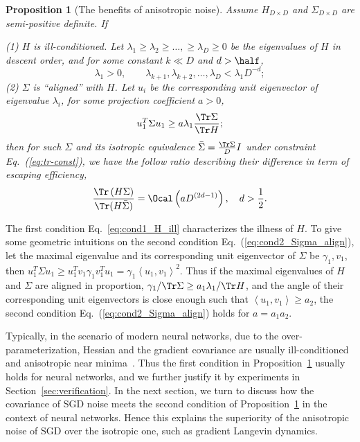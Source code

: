 \documentclass{article}
\newtheorem{proposition}{Proposition}
\begin{document}
\begin{proposition}[The benefits of anisotropic noise]
Assume $H_{D\times D}$ and $\Sigma_{D\times D}$ are semi-positive definite. If 

(1) $H$ is ill-conditioned.
Let $\lambda_1 \ge \lambda_2 \ge \dots, \ge \lambda_D \ge 0$ be the eigenvalues of $H$ in descent order, and for some constant $k\ll D$ and $d>\half$,
\begin{equation}
    \lambda_1 > 0,\qquad \lambda_{k+1}, \lambda_{k+2}, \dots, \lambda_{D} < \lambda_1 D^{-d};
    \label{eq:cond1_H_ill}
\end{equation}
(2) $\Sigma$ is ``aligned'' with $H$.
Let $u_i$ be the corresponding unit eigenvector of eigenvalue $\lambda_i$, for some projection coefficient $a>0$,
\begin{equation}
    u_1^T\Sigma u_1 \ge a \lambda_1 \frac{\Tr\Sigma}{\Tr H};
    \label{eq:cond2_Sigma_align}
\end{equation}
then for such $\Sigma$ and its isotropic equivalence $\bar{\Sigma} = \frac{\Tr\Sigma}{D}I$ under constraint Eq.~(\ref{eq:tr-const}),
we have the follow ratio describing their difference in term of escaping efficiency,
\begin{equation}
    \frac{\Tr\left(H\Sigma\right)}{\Tr(H\bar{\Sigma})} = \Ocal \left(a D^{(2d-1)}\right), \quad d > \frac{1}{2}.
    \label{eq:ratio}
\end{equation}
\label{thm:aniso_benefit}
\end{proposition}
The first condition Eq.~\eqref{eq:cond1_H_ill} characterizes the illness of $H$.
To give some geometric intuitions on the second condition Eq.~(\ref{eq:cond2_Sigma_align}), let the maximal eigenvalue and its corresponding unit eigenvector of $\Sigma$ be $\gamma_1, v_1$, then
$ u_1^T\Sigma u_1 \geq u_1^Tv_1\gamma_1 v_1^T u_1 = \gamma_1 \left<u_1, v_1\right>^2 $.
Thus if the maximal eigenvalues of $H$ and $\Sigma$ are aligned in proportion, $\gamma_1/\Tr\Sigma \ge a_1 \lambda_1/\Tr H$, and the angle of their corresponding unit eigenvectors is close enough such that $\left<u_1, v_1\right> \ge a_2$, the second condition Eq.~(\ref{eq:cond2_Sigma_align}) holds for $a =a_1 a_2$.

Typically, in the scenario of modern neural networks, due to the over-parameterization, Hessian and the gradient covariance are usually ill-conditioned and anisotropic near minima~\citep{sagun2017empirical,chaudhari2017stochastic}. Thus the first condition in Proposition~\ref{thm:aniso_benefit} usually holds for neural networks, and we further justify it by experiments in Section~\ref{sec:verification}. 
In the next section, we turn to discuss how the covariance of SGD noise meets the second condition of Proposition~\ref{thm:aniso_benefit} in the context of neural networks.
Hence this explains the superiority of the anisotropic noise of SGD over the isotropic one, such as gradient Langevin dynamics. 
\end{document}
